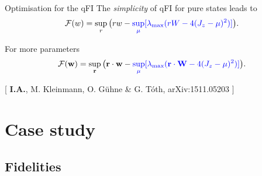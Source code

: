 \documentclass{beamer}
\newcommand{\citate}[1]{{\footnotesize{\color{gray}[ #1 ]}}

	}
\begin{document}
		\begin{frame}
			\begin{block}
				{Optimisation for the qFI}
				The \emph{\color{blue} simplicity} of qFI for pure states leads to
				{\small
				\[
				\mathcal{F}(w) = \sup_{r} \big( r w - {\color{blue}\sup_{\mu} [ \lambda_{\max} ( r W - 4(J_z-{\color{blue}\mu})^2 ) ]} \big).
				\]}

				For more parameters
				{\small
				\[
				\mathcal{F}(\mathbf{w}) = \sup_{\mathbf{r}} \big( \mathbf{r}\cdot \mathbf{w} - {\color{blue}\sup_{\mu} [ \lambda_{\max} ( \mathbf{r}\cdot \mathbf{W} - 4(J_z-{\color{blue}\mu})^2 ) ]} \big).
				\]}
			\end{block}

			\citate{\textbf{I.A.}, M. Kleinmann, O. G\"uhne \& G. T\'oth, arXiv:1511.05203}

		\end{frame}

\section{Case study}

		\begin{frame}
			\tableofcontents[currentsection]

		\end{frame}

	\subsection{Fidelities}
\end{document}
